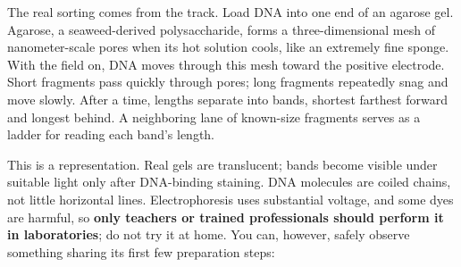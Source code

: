 The real sorting comes from the track. Load DNA into one end of an agarose gel. Agarose, a seaweed-derived polysaccharide, forms a three-dimensional mesh of nanometer-scale pores when its hot solution cools, like an extremely fine sponge. With the field on, DNA moves through this mesh toward the positive electrode. Short fragments pass quickly through pores; long fragments repeatedly snag and move slowly. After a time, lengths separate into bands, shortest farthest forward and longest behind. A neighboring lane of known-size fragments serves as a ladder for reading each band's length.

\begin{center}
\end{center}

This is a representation. Real gels are translucent; bands become visible under suitable light only after DNA-binding staining. DNA molecules are coiled chains, not little horizontal lines. Electrophoresis uses substantial voltage, and some dyes are harmful, so \textbf{only teachers or trained professionals should perform it in laboratories}; do not try it at home. You can, however, safely observe something sharing its first few preparation steps:

